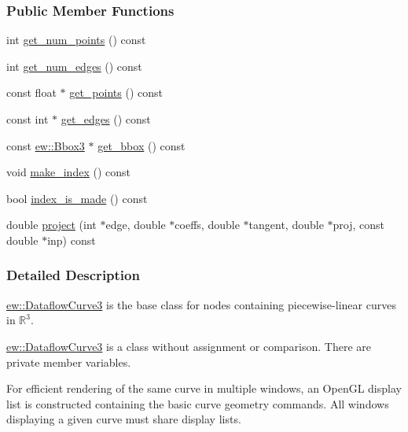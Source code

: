 \subsubsection*{Public Member Functions}
\begin{DoxyCompactItemize}
\item 
int \hyperlink{classew_1_1DataflowCurve3_afa6639c14717ab3d2a64ed48bc37683d}{get\_\-num\_\-points} () const 
\item 
int \hyperlink{classew_1_1DataflowCurve3_a1617f1c56fc2b04284180f7bb4f707e1}{get\_\-num\_\-edges} () const 
\item 
const float $\ast$ \hyperlink{classew_1_1DataflowCurve3_a8e88c66552e476c51b3719e7316d3565}{get\_\-points} () const 
\item 
const int $\ast$ \hyperlink{classew_1_1DataflowCurve3_af1fc7dfffb82610efedae52e69262daf}{get\_\-edges} () const 
\item 
const \hyperlink{classew_1_1Bbox3}{ew::Bbox3} $\ast$ \hyperlink{classew_1_1DataflowCurve3_a11b0a9f416916cf526988d7a787e61f4}{get\_\-bbox} () const 
\item 
void \hyperlink{classew_1_1DataflowCurve3_a3705ea92d9fc796b4013f1b862607c73}{make\_\-index} () const 
\item 
bool \hyperlink{classew_1_1DataflowCurve3_ae1314c04d06c2b29651bedfd0d68e0bd}{index\_\-is\_\-made} () const 
\item 
double \hyperlink{classew_1_1DataflowCurve3_a914a3fd65c2a397f0fef3ad5e1f67bce}{project} (int $\ast$edge, double $\ast$coeffs, double $\ast$tangent, double $\ast$proj, const double $\ast$inp) const 
\end{DoxyCompactItemize}


\subsubsection{Detailed Description}
\hyperlink{classew_1_1DataflowCurve3}{ew::DataflowCurve3} is the base class for nodes containing piecewise-\/linear curves in $\mathbb{R}^3$.

\hyperlink{classew_1_1DataflowCurve3}{ew::DataflowCurve3} is a class without assignment or comparison. There are private member variables.

For efficient rendering of the same curve in multiple windows, an OpenGL display list is constructed containing the basic curve geometry commands. All windows displaying a given curve must share display lists. 


